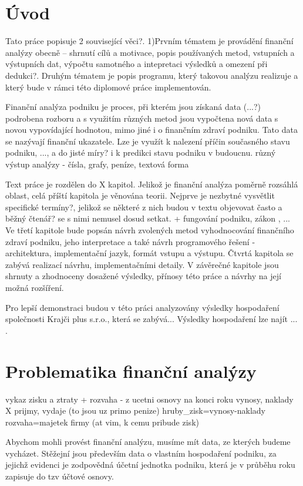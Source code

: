 \chapter{Úvod}
Tato práce popisuje 2 související věci?. 
1)Prvním tématem je provádění finanční analýzy obecně -- shrnutí cílů a motivace, popis používaných metod, vstupních a výstupních dat, výpočtu samotného a intepretaci výsledků a omezení při dedukci?. Druhým tématem je popis programu, který takovou analýzu realizuje a který bude v rámci této diplomové práce implementován.

Finanční analýza podniku je proces, při kterém jsou získaná data (...?) podrobena rozboru a s využitím různých metod jsou vypočtena nová data s novou vypovídající hodnotou, mimo jiné i o finančním zdraví podniku. Tato data se nazývají finanční ukazatele. Lze je využít k nalezení příčin současného stavu podniku, ..., a do jisté míry? i k predikci stavu podniku v budoucnu.
různý výstup analýzy - čísla, grafy, peníze, textová forma

Text práce je rozdělen do X kapitol. Jelikož je finanční analýza poměrně rozsáhlá oblast, celá příští kapitola je věnována teorii. Nejprve je nezbytné vysvětlit specifické termíny?, jelikož se některé z nich budou v textu objevovat často a běžný čtenář? se s nimi nemusel dosud setkat. + fungování podniku, zákon , ...
Ve třetí kapitole bude popsán návrh zvolených metod vyhodnocování finančního zdraví podniku, jeho interpretace a také návrh programového řešení - architektura, implementační jazyk, formát vstupu a výstupu. Čtvrtá kapitola se zabývá realizací návrhu, implementačními detaily. V závěrečné kapitole jsou shrnuty a zhodnoceny dosažené výsledky, přínosy této práce a návrhy na její možná rozšíření.

Pro lepší demonstraci budou v této práci analyzovány výsledky hospodaření společnosti Krajči plus s.r.o., která se zabývá... Výsledky hospodaření lze najít ... .

\chapter{Problematika finanční analýzy}

vykaz zisku a ztraty + rozvaha - z ucetni osnovy na konci roku
vynosy, naklady X prijmy, vydaje (to jsou uz primo penize)
hruby\_zisk=vynosy-naklady
rozvaha=majetek firmy (at vim, k cemu pribude zisk)

Abychom mohli provést finanční analýzu, musíme mít data, ze kterých budeme vycházet. Stěžejní jsou především data o vlastním hospodaření podniku, za jejichž evidenci je zodpovědná účetní jednotka podniku, která je v průběhu roku zapisuje do tzv účtové osnovy.
